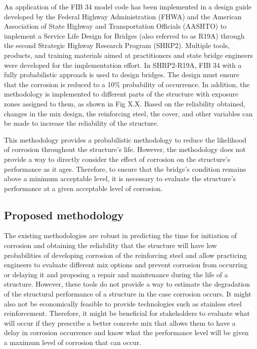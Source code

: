 An application of the FIB 34 model code has been implemented in a design guide developed by the Federal Highway Administration (FHWA) and the  American Association of State Highway and Transportation Officials (AASHTO) to implement a Service Life Design for Bridges (also referred to as R19A) through the second Strategic Highway Research Program (SHRP2)\cite{SHRP22019}. Multiple tools, products, and training materials aimed at practitioners and state bridge engineers were developed for the implementation effort. In SHRP2-R19A, FIB 34 with a fully probabilistic approach is used to design bridges. The design must ensure that the corrosion is reduced to a 10\% probability of occurrence. In addition, the methodology is implemented to different parts of the structure with exposure zones assigned to them, as shown in Fig X.X. Based on the reliability obtained, changes in the mix design, the reinforcing steel, the cover, and other variables can be made to increase the reliability of the structure. 

This methodology provides a probabilistic methodology to reduce the likelihood of corrosion throughout the structure's life. However, the methodology does not provide a way to directly consider the effect of corrosion on the structure's performance as it ages. Therefore, to ensure that the bridge's condition remains above a minimum acceptable level, it is necessary to evaluate the structure's performance at a given acceptable level of corrosion.

\subsection{Proposed methodology}

The existing methodologies are robust in predicting the time for initiation of corrosion and obtaining the reliability that the structure will have low probabilities of developing corrosion of the reinforcing steel and allow practicing engineers to evaluate different mix options and prevent corrosion from occurring or delaying it and proposing a repair and maintenance during the life of a structure. However, these tools do not provide a way to estimate the degradation of the structural performance of a structure in the case corrosion occurs. It might also not be economically feasible to provide technologies such as stainless steel reinforcement. Therefore, it might be beneficial for stakeholders to evaluate what will occur if they prescribe a better concrete mix that allows them to have a delay in corrosion occurrence and know what the performance level will be given a maximum level of corrosion that can occur.

